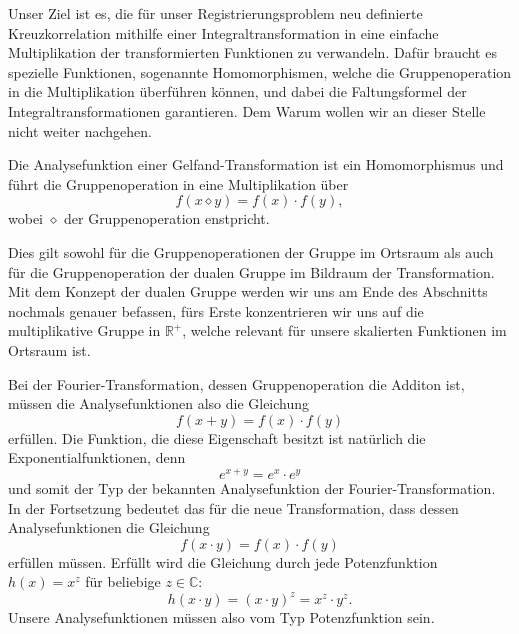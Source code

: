 Unser Ziel ist es, die für unser Registrierungsproblem neu definierte 
Kreuzkorrelation mithilfe einer Integraltransformation in eine 
einfache Multiplikation der transformierten Funktionen zu verwandeln.
Dafür braucht es spezielle Funktionen, sogenannte Homomorphismen, welche 
die Gruppenoperation in die Multiplikation überführen können, und dabei 
die Faltungsformel der Integraltransformationen garantieren.
Dem Warum wollen wir an dieser Stelle nicht weiter nachgehen.
\begin{satz}
    Die Analysefunktion einer Gelfand-Transformation ist ein 
    Homomorphismus und führt die Gruppenoperation in eine 
    Multiplikation über
    \[
        f(x \diamond y) 
        = f(x) \cdot f(y)
        ,
    \]
    wobei $\diamond$ der Gruppenoperation enstpricht.
\end{satz}
Dies gilt sowohl für die Gruppenoperationen der Gruppe im Ortsraum als auch 
für die Gruppenoperation der dualen Gruppe im Bildraum der Transformation.
Mit dem Konzept der dualen Gruppe werden wir uns am Ende des Abschnitts 
nochmals genauer befassen, fürs Erste konzentrieren wir uns auf die 
multiplikative Gruppe in $\mathbb{R^+}$, welche relevant für unsere 
skalierten Funktionen im Ortsraum ist.

Bei der Fourier-Transformation, dessen Gruppenoperation die Additon ist, 
müssen die Analysefunktionen also die Gleichung 
\begin{equation}
    f(x + y) 
    = f(x) \cdot f(y)
    \label{mellin:hom1}
\end{equation}
erfüllen. 
Die Funktion, die diese Eigenschaft besitzt ist natürlich die 
Exponentialfunktionen, denn 
\begin{equation}
    e^{x + y} 
    = e^x \cdot e^y
    \label{mellin:exp}
\end{equation}
und somit der Typ der bekannten Analysefunktion der Fourier-Transformation.
In der Fortsetzung bedeutet das für die neue Transformation, dass dessen 
Analysefunktionen die Gleichung
\begin{equation}
    f(x \cdot y) 
    = f(x) \cdot f(y)
    \label{mellin:hom2}
\end{equation}
erfüllen müssen.
Erfüllt wird die Gleichung durch jede Potenzfunktion $h(x) = x^{z}$ für 
beliebige $z \in \mathbb{C}$:
\begin{equation}
    h(x \cdot y) 
    = (x \cdot y)^{z} = x^{z} \cdot y^{z}
    .
\end{equation}
Unsere Analysefunktionen müssen also vom Typ Potenzfunktion sein.

